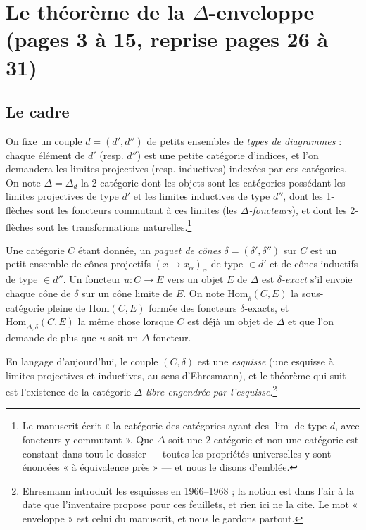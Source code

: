 \documentclass[11pt,a4paper]{article}
\begin{document}
\section*{Le théorème de la $\Delta$-enveloppe (pages 3 à 15, reprise pages 26 à 31)}

\subsection*{Le cadre}

On fixe un couple $d = (d', d'')$ de petits ensembles de \emph{types de
diagrammes} : chaque élément de $d'$ (resp. $d''$) est une petite catégorie
d'indices, et l'on demandera les limites projectives (resp. inductives)
indexées par ces catégories. On note $\Delta = \Delta_{d}$ la 2-catégorie
dont les objets sont les catégories possédant les limites projectives de
type $d'$ et les limites inductives de type $d''$, dont les 1-flèches sont
les foncteurs commutant à ces limites (les \emph{$\Delta$-foncteurs}), et
dont les 2-flèches sont les transformations naturelles.\footnote{Le
manuscrit écrit « la catégorie des catégories ayant des $\lim$ de type $d$,
avec foncteurs y commutant ». Que $\Delta$ soit une 2-catégorie et non une
catégorie est constant dans tout le dossier — toutes les propriétés
universelles y sont énoncées « à équivalence près » — et nous le disons
d'emblée.}

Une catégorie $C$ étant donnée, un \emph{paquet de cônes} $\delta =
(\delta', \delta'')$ sur $C$ est un petit ensemble de cônes projectifs
$(x \to x_{\alpha})_{\alpha}$ de type $\in d'$ et de cônes inductifs de
type $\in d''$. Un foncteur $u : C \to E$ vers un objet $E$ de $\Delta$
est \emph{$\delta$-exact} s'il envoie chaque cône de $\delta$ sur un cône
limite de $E$. On note $\underline{\mathrm{Hom}}_{\delta}(C, E)$ la
sous-catégorie pleine de $\underline{\mathrm{Hom}}(C, E)$ formée des
foncteurs $\delta$-exacts, et $\underline{\mathrm{Hom}}_{\Delta,\delta}(C,E)$
la même chose lorsque $C$ est déjà un objet de $\Delta$ et que l'on
demande de plus que $u$ soit un $\Delta$-foncteur.

En langage d'aujourd'hui, le couple $(C, \delta)$ est une \emph{esquisse}
(une esquisse à limites projectives et inductives, au sens d'Ehresmann),
et le théorème qui suit est l'existence de la catégorie
\emph{$\Delta$-libre engendrée par l'esquisse}.\footnote{Ehresmann
introduit les esquisses en 1966--1968 ; la notion est dans l'air à la date
que l'inventaire propose pour ces feuillets, et rien ici ne la cite. Le mot
« enveloppe » est celui du manuscrit, et nous le gardons partout.}
\end{document}
